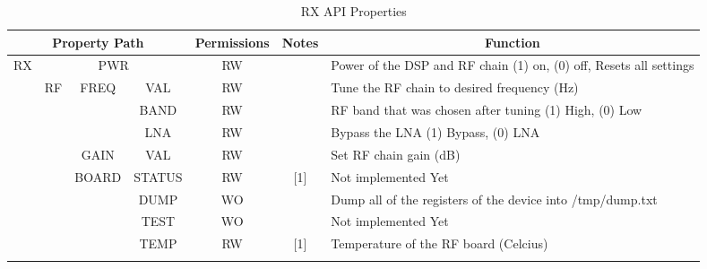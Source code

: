 \documentclass[11pt]{article}
\begin{document}
{\begin{landscape}
\begin{table}[H]
\centering
\small
\caption{RX API Properties}
\label{table:rx-api}
\begin{tabular}{|c|c|c|c|c|c|l|}
\hline
\multicolumn{4}{|c|}{{\bf Property Path}}                                             & {\bf Permissions} & {\bf Notes} & \multicolumn{1}{c|}{{\bf Function}}                                   \\ \hline
\multirow{25}{*}{RX}   & \multicolumn{3}{c|}{PWR}                                     & RW                &             & Power of the DSP and RF chain (1) on, (0) off, Resets all settings    \\ \cline{2-7} 
                       & \multirow{9}{*}{RF}     & \multirow{3}{*}{FREQ}  & VAL       & RW                &             & Tune the RF chain to desired frequency (Hz)                           \\ \cline{4-7} 
                       &                         &                        & BAND      & RW                &             & RF band that was chosen after tuning (1) High, (0) Low                \\ \cline{4-7} 
                       &                         &                        & LNA       & RW                &             & Bypass the LNA (1) Bypass, (0) LNA                                    \\ \cline{3-7} 
                       &                         & GAIN                   & VAL       & RW                &             & Set RF chain gain (dB)                                                \\ \cline{3-7} 
                       &                         & \multirow{5}{*}{BOARD} & STATUS    & RW                & [1]         & Not implemented Yet                                                   \\ \cline{4-7} 
                       &                         &                        & DUMP      & WO                &             & Dump all of the registers of the device into /tmp/dump.txt            \\ \cline{4-7} 
                       &                         &                        & TEST      & WO                &             & Not implemented Yet                                                   \\ \cline{4-7} 
                       &                         &                        & TEMP      & RW                & [1]         & Temperature of the RF board (Celcius)                                 \\ \cline{4-7} 

\end{tabular}
\end{table}
\end{landscape}}
\end{document}
